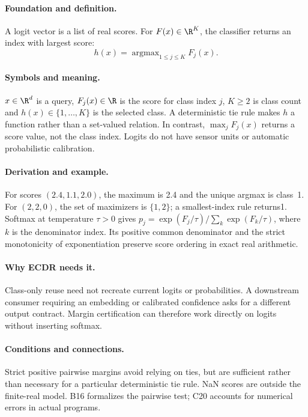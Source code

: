 \paragraph{Foundation and definition.}
A logit vector is a list of real scores. For $F(x)\in\R^K$, the classifier
returns an index with largest score:
\[
 h(x)=\operatorname{argmax}_{1\le j\le K}F_j(x).
\]
\paragraph{Symbols and meaning.}
$x\in\R^d$ is a query, $F_j(x)\in\R$ is the score for class index $j$,
$K\ge2$ is class count and $h(x)\in\{1,\ldots,K\}$ is the selected
class. A deterministic tie rule makes $h$ a function rather than a
set-valued relation. In contrast, $\max_jF_j(x)$ returns a score value,
not the class index. Logits do not have sensor units or automatic
probabilistic calibration.
\paragraph{Derivation and example.}
For scores $(2.4,1.1,2.0)$, the maximum is 2.4 and the unique argmax is
class~1. For $(2,2,0)$, the set of maximizers is $\{1,2\}$; a
smallest-index rule returns1. Softmax at temperature $\tau>0$ gives
$p_j=\exp(F_j/\tau)/\sum_k\exp(F_k/\tau)$, where $k$ is the denominator
index. Its positive common denominator and the strict monotonicity of
exponentiation preserve score ordering in exact real arithmetic.
\paragraph{Why ECDR needs it.}
Class-only reuse need not recreate current logits or probabilities. A
downstream consumer requiring an embedding or calibrated confidence asks
for a different output contract. Margin certification can therefore work
directly on logits without inserting softmax.
\paragraph{Conditions and connections.}
Strict positive pairwise margins avoid relying on ties, but are sufficient
rather than necessary for a particular deterministic tie rule. NaN scores
are outside the finite-real model. B16 formalizes the pairwise test;
C20 accounts for numerical errors in actual programs.

